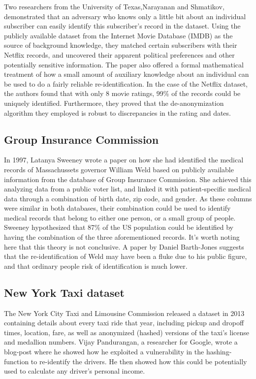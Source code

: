 Two researchers from the University of Texas,Narayanan and Shmatikov\cite{narayanan2008robust}, demonstrated that an adversary who knows only a little bit about an individual subscriber can easily identify this subscriber's record in the dataset. Using the publicly available dataset from the Internet Movie Database (IMDB) as the source of background knowledge, they matched certain subscribers with their Netflix records, and uncovered their apparent political preferences and other potentially sensitive information. The paper also offered a formal mathematical treatment of how a small amount of auxiliary knowledge about an individual can be used to do a fairly reliable re-identification. In the case of the Netflix dataset, the authors \cite{narayanan2008robust} found that with only 8 movie ratings, 99\% of the records could be uniquely identified. Furthermore, they proved that the de-anonymization algorithm they employed is robust to discrepancies in the rating and dates.

\subsection{Group Insurance Commission} \label{sec:GIC}
In 1997, Latanya Sweeney wrote a paper on how she had identified the medical records of Massachussets governor William Weld based on publicly available information from the database of Group Insurance Commission. She achieved this analyzing data from a public voter list, and linked it with patient-specific medical data through a combination of birth date, zip code, and gender\cite{sweeney2002k}. As these columns were similar in both databases, their combination could be used to identify medical records that belong to either one person, or a small group of people. Sweeney hypothesized that 87\% of the US population could be identified by having the combination of the three aforementioned records. It's worth noting here that this theory is not conclusive. A paper by Daniel Barth-Jones suggests that the re-identification of Weld may have been a fluke due to his public figure, and that ordinary people risk of identification is much lower\cite{barth2012re}. 

\subsection{New York Taxi dataset} 
The New York City Taxi and Limousine Commission released a dataset in 2013 containing details about every taxi ride that year, including pickup and dropoff times, location, fare, as well as anonymized (hashed) versions of the taxi's license and medallion numbers. Vijay Pandurangan, a researcher for Google, wrote a blog-post where he showed how he exploited a vulnerability in the hashing-function to re-identify the drivers. He then showed how this could be potentially used to calculate any driver's personal income\cite{vijay2014online}. 

